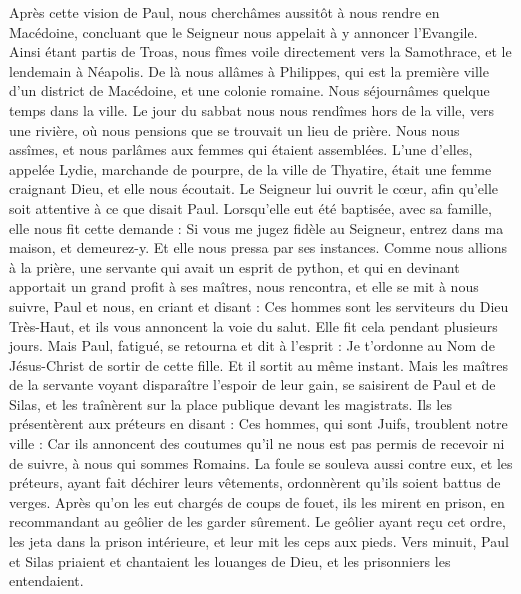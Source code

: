 \begin{multicols}{2}
Après cette vision de Paul, nous cherchâmes aussitôt à nous rendre en Macédoine, concluant que le Seigneur nous appelait à y annoncer l’Evangile.
Ainsi étant partis de Troas, nous fîmes voile directement vers la Samothrace, et le lendemain à Néapolis.
De là nous allâmes à Philippes, qui est la première ville d’un district de Macédoine, et une colonie romaine. Nous séjournâmes quelque temps dans la ville.
Le jour du sabbat nous nous rendîmes hors de la ville, vers une rivière, où nous pensions que se trouvait un lieu de prière. Nous nous assîmes, et nous parlâmes aux femmes qui étaient assemblées.
L’une d’elles, appelée Lydie, marchande de pourpre, de la ville de Thyatire, était une femme craignant Dieu, et elle nous écoutait. Le Seigneur lui ouvrit le cœur, afin qu'elle soit attentive à ce que disait Paul.
Lorsqu’elle eut été baptisée, avec sa famille, elle nous fit cette demande : Si vous me jugez fidèle au Seigneur, entrez dans ma maison, et demeurez-y. Et elle nous pressa par ses instances.
Comme nous allions à la prière, une servante qui avait un esprit de python, et qui en devinant apportait un grand profit à ses maîtres, nous rencontra,
et elle se mit à nous suivre, Paul et nous, en criant et disant : Ces hommes sont les serviteurs du Dieu Très-Haut, et ils vous annoncent la voie du salut.
Elle fit cela pendant plusieurs jours. Mais Paul, fatigué, se retourna et dit à l'esprit : Je t’ordonne au Nom de Jésus-Christ de sortir de cette fille. Et il sortit au même instant.
Mais les maîtres de la servante voyant disparaître l’espoir de leur gain, se saisirent de Paul et de Silas, et les traînèrent sur la place publique devant les magistrats.
Ils les présentèrent aux préteurs en disant : Ces hommes, qui sont Juifs, troublent notre ville :
Car ils annoncent des coutumes qu'il ne nous est pas permis de recevoir ni de suivre, à nous qui sommes Romains.
La foule se souleva aussi contre eux, et les préteurs, ayant fait déchirer leurs vêtements, ordonnèrent qu'ils soient battus de verges.
Après qu’on les eut chargés de coups de fouet, ils les mirent en prison, en recommandant au geôlier de les garder sûrement.
Le geôlier ayant reçu cet ordre, les jeta dans la prison intérieure, et leur mit les ceps aux pieds.
Vers minuit, Paul et Silas priaient et chantaient les louanges de Dieu, et les prisonniers les entendaient.

\end{multicols}
